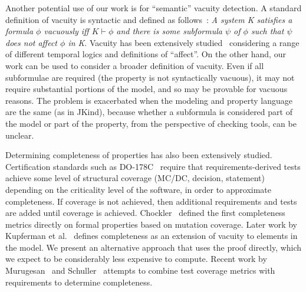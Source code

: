 Another potential use of our work is for ``semantic'' vacuity detection.  A standard definition of vacuity is syntactic and defined as follows~\cite{Kupferman:2006:SCF}: {\em A system K satisfies a formula $\phi$ vacuously iff $K \vdash \phi$ and there is some subformula $\psi$ of $\phi$ such that $\psi$ does not affect $\phi$ in K}.  Vacuity has been extensively studied~\cite{Gurfinkel:2012:RVB,Chockler2008,DBLP:Ben-DavidK13,Kupferman:2006:SCF,Chockler:2007,Beer1997} considering a range of different temporal logics and definitions of ``affect''.  On the other hand, our work can be used to consider a broader definition of vacuity.  Even if all subformulae are required (the property is not syntactically vacuous), it may not require substantial portions of the model, and so may be provable for vacuous reasons.  The problem is exacerbated when the modeling and property language are the same (as in JKind), because whether a subformula is considered part of the model or part of the property, from the perspective of checking tools, can be unclear.

Determining completeness of properties has also been extensively studied. Certification standards such as DO-178C~\cite{DO178C} require that requirements-derived tests achieve some level of structural coverage (MC/DC, decision, statement) depending on the criticality level of the software, in order to approximate completeness.  If coverage is not achieved, then additional requirements and tests are added until coverage is achieved.  Chockler~\cite{chockler_coverage_2003} defined the first completeness metrics directly on formal properties based on mutation coverage.  Later work by Kupferman et al.~\cite{Kupferman:2006:SCF} defines completeness as an extension of vacuity to elements in the model.  We present an alternative approach that uses the proof directly, which we expect to be considerably less expensive to compute.  Recent work by Murugesan~\cite{murugesan2015we} and Schuller~\cite{schuler_assessing_2011} attempts to combine test coverage metrics with requirements to determine completeness.




\iffalse
\begin{itemize}
    \item MUS's : checked
    \item Work on Alloy: checked
    \item Work that Teme pointed us to : will be added
    \item Anything else Elaheh has found : \%60 checked
\end{itemize}
\fi

